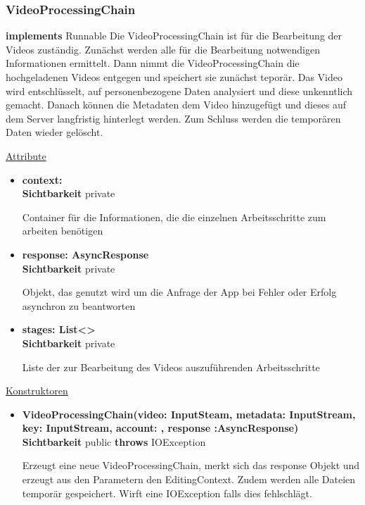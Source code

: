 \subsubsection{VideoProcessingChain} \label{service:klasse:VideoProcessingChain}
\textbf{implements} Runnable \newline
Die VideoProcessingChain ist für die Bearbeitung der Videos zuständig. Zunächst werden alle für die Bearbeitung notwendigen Informationen ermittelt. Dann nimmt die VideoProcessingChain die hochgeladenen Videos entgegen und speichert sie zunächst teporär. Das Video wird entschlüsselt, auf personenbezogene Daten analysiert und diese unkenntlich gemacht. Danach können die Metadaten dem Video hinzugefügt und dieses auf dem Server langfristig hinterlegt werden. Zum Schluss werden die temporären Daten wieder gelöscht.\newline

\underline{Attribute}
\begin{itemize}
\itemsep0pt
\item \textbf{context: } \hfill\\ 
\textbf{Sichtbarkeit} private

Container für die Informationen, die die einzelnen Arbeitsschritte zum arbeiten benötigen

\item \textbf{response: AsyncResponse} \hfill\\ 
\textbf{Sichtbarkeit} private

Objekt, das genutzt wird um die Anfrage der App bei Fehler oder Erfolg asynchron zu beantworten

\item \textbf{stages: List<>} \hfill\\ 
\textbf{Sichtbarkeit} private

Liste der zur Bearbeitung des Videos auszuführenden Arbeitsschritte
\end{itemize}

\underline{Konstruktoren}
\begin{itemize}
\itemsep0pt
\item \textbf{VideoProcessingChain(video: InputSteam, metadata: InputStream, 
key: InputStream, account: , response :AsyncResponse)} \hfill\\
\textbf{Sichtbarkeit} public \newline
\textbf{throws} IOException

Erzeugt eine neue VideoProcessingChain, merkt sich das response Objekt und erzeugt aus den Parametern den EditingContext. Zudem werden alle Dateien temporär gespeichert. Wirft eine IOException falls dies fehlschlägt.
\end{itemize}

